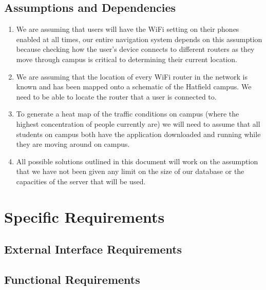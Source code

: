 \documentclass[a4paper,12pt]{article}
\begin{document}
\subsection{Assumptions and Dependencies}
\begin{enumerate}
\item We are assuming that users will have the WiFi setting on their phones enabled at all times, our entire navigation system depends on this assumption because checking how the user's device connects to different routers as they move through campus is critical to determining their current location. 
\item We are assuming that the location of every WiFi router in the network is known and has been mapped onto a schematic of the Hatfield campus. We need to be able to locate the router that a user is connected to.
\item To generate a heat map of the traffic conditions on campus (where the highest concentration of people currently are) we will need to assume that all students on campus both have the application downloaded and running while they are moving around on campus.
\item All possible solutions outlined in this document will work on the assumption that we have not been given any limit on the size of our database or the capacities of the server that will be used.
\end{enumerate}

\section{Specific Requirements}
\subsection{External Interface Requirements}
\subsection{Functional Requirements}
\end{document}
